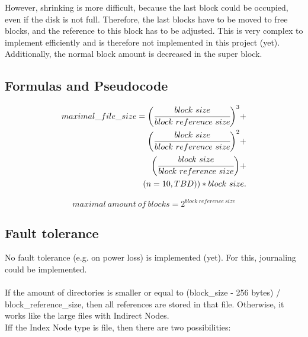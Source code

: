 \documentclass[JCDReport.tex]{subfiles}
\begin{document}
However, shrinking is more difficult, because the last block could be occupied, even if the disk is not full. Therefore, the last blocks have to be moved to free blocks, and the reference to this block has to be adjusted. This is very complex to implement efficiently and is therefore not implemented in this project (yet).\\
Additionally, the normal block amount is decreased in the super block.

\subsection{Formulas and Pseudocode}

\begin{equation}
\begin{split}
maximal\_file\_size =
  \bigg(\cfrac{block\ size}{block\ reference\ size}\bigg)^3 +\\
  \bigg(\cfrac{block\ size}{block\ reference\ size}\bigg)^2 +\\
  \bigg(\cfrac{block\ size}{block\ reference\ size}\bigg) +\\
  (n=10, TBD)) * block\ size.
\end{split}
\end{equation}

\begin{equation}
maximal\ amount\ of\ blocks = 2^{block\ reference\ size}
\end{equation}



\subsection{Fault tolerance}

No fault tolerance (e.g. on power loss) is implemented (yet). For this, journaling could be implemented.\\
\\







If the amount of directories is smaller or equal to (block\_size - 256 bytes) / block\_reference\_size, 
then all references are stored in that file. Otherwise, it works like the large files with Indirect Nodes.\\


Iff the Index Node type is file, then there are two possibilities:
\end{document}
